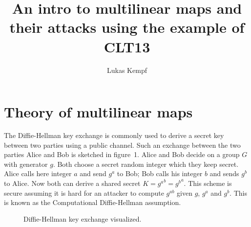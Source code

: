 \documentclass[english]{scrartcl}
\title{An intro to multilinear maps and their attacks using the example of CLT13}
\author{Lukas Kempf}
\theoremstyle{plain}
\theoremstyle{definition}
\begin{document}
    \maketitle

    \tableofcontents

    \section{Theory of multilinear maps}\label{sec:intro}

    The Diffie-Hellman key exchange is commonly used to derive a secret key between two parties using a public channel. Such an exchange between the two parties Alice and Bob is sketched in figure~1. Alice and Bob decide on a group $G$ with generator $g$. Both choose a secret random integer which they keep secret. Alice calls here integer $a$ and send $g^a$ to Bob; Bob calls his integer $b$ and sends $g^b$ to Alice.
    Now both can derive a shared secret $K = {g^a}^b = {g^b}^a$. This scheme is secure assuming it is hard for an attacker to compute $g^{ab}$ given $g$, $g^a$ and $g^b$. This is known as the Computational Diffie-Hellman assumption.

    \begin{figure}
        \centering
        \caption{Diffie-Hellman key exchange visualized.}
    \end{figure}
\end{document}
